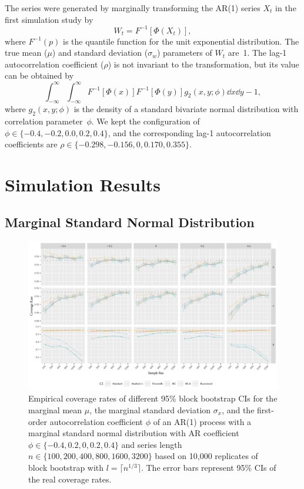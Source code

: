 \documentclass[10pt]{article}
\begin{document}
The series were generated by marginally transforming the
AR(1) series $X_t$ in the first simulation study by
\begin{equation*}
W_t = F^{-1}[\Phi(X_t)],
\end{equation*}
where $F^{-1}(p)$ is the quantile function for the unit exponential 
distribution. The true mean ($\mu$) and standard deviation ($\sigma_w$) 
parameters of $W_t$ are~1. The lag-1
autocorrelation coefficient ($\rho$) is not invariant to the
transformation,\citep{hofert2018elements} but its value can be obtained by
\begin{equation*}
\int_{-\infty}^\infty \int_{-\infty}^\infty F^{-1}[\Phi(x)] F^{-1}[\Phi(y)] g_2(x, y; \phi) \dd x \dd y - 1,
\end{equation*}
where $g_2(x, y; \phi)$ is the density of a standard bivariate normal
distribution with correlation parameter~$\phi$. We kept the configuration of
$\phi \in \{-0.4, -0.2, 0.0, 0.2, 0.4\}$, and the corresponding lag-1
autocorrelation coefficients are
$\rho \in \{-0.298, \allowbreak -0.156, 0, 0.170, 0.355\}$.




\section*{Simulation Results}
\label{sec:simres}


\subsection*{Marginal Standard Normal Distribution}

\begin{figure}[tbp]
  \centering
  \includegraphics[width=\textwidth]{figures/alt_plot_norm1}
  \caption{Empirical coverage rates of different 95\% block bootstrap CIs for
    the marginal mean $\mu$, the marginal standard deviation $\sigma_x$, and
    the first-order autocorrelation coefficient $\phi$ of an AR(1) process with 
    a marginal standard 
    normal distribution with AR coefficient
    $\phi \in \{-0.4, 0.2, 0, 0.2, 0.4\}$ and series length
    $n \in \{100, 200, 400, 800, 1600, 3200\}$ based on 10,000 replicates
    of
    block bootstrap with $l = \lceil n^{1/3} \rceil$. The
    error bars represent 95\% CIs of the real coverage rates.}
  \label{fig:norm1}
\end{figure}
\end{document}

